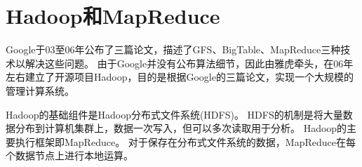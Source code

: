 \section{Hadoop和MapReduce}
Google于03至06年公布了三篇论文，描述了GFS、BigTable、MapReduce三种技术以解决这些问题\parencite{Dean2004MapReduce,Ghemawat2003The,Chang2008Bigtable}。
由于Google并没有公布算法细节，因此由雅虎牵头，在06年左右建立了开源项目Hadoop，目的是根据Google的三篇论文，实现一个大规模的管理计算系统。

Hadoop的基础组件是Hadoop分布式文件系统(HDFS)。
HDFS的机制是将大量数据分布到计算机集群上，数据一次写入，但可以多次读取用于分析。
Hadoop的主要执行框架即MapReduce。
对于保存在分布式文件系统的数据，MapReduce在每个数据节点上进行本地运算。
\def\HDFSfront{
	\path (0,0) node(Splitn) [rectangle,draw] {Split(n)}
			(0,1) node {$\cdots$}
			(0,2) node(Split3) [rectangle,draw] {Split(3)}
			(0,3) node(Split2) [rectangle,draw] {Split(2)}
			(0,4) node(Split1) [rectangle,draw] {Split(1)}
			(0,5.5) node {\textbf{HDFS}};
	\draw (-1,-1) rectangle (1,6);
}
\def\HDFSend{
	\path (10,0) node(Partn) [rectangle,draw] {Part(n)}
			(10,1) node {$\cdots$}
			(10,2) node(Part3) [rectangle,draw] {Part(3)}
			(10,3) node(Part2) [rectangle,draw] {Part(2)}
			(10,4) node(Part1) [rectangle,draw] {Part(1)}
			(10,5.5) node {\textbf{HDFS}};
	\draw (9,-1) rectangle (11,6);
}
\def\mapper{
	\path (3.5,-1) node(Mapper4) [rectangle,draw] {\textbf{Mapper}}
			(3.5,0.5) node {$\cdots$}
			(3.5,2) node(Mapper3) [rectangle,draw] {\textbf{Mapper}}
			(3.5,3.5) node(Mapper2) [rectangle,draw] {\textbf{Mapper}}
			(3.5,5) node(Mapper1) [rectangle,draw] {\textbf{Mapper}};
}
\def\reducer{
	\path (7,1) node(Reducer2) [rectangle,draw] {\textbf{Reducer}}
			(7,2.5) node {$\cdots$}
			(7,4) node(Reducer1) [rectangle,draw] {\textbf{Reducer}};
}
\begin{center}
\end{center}
